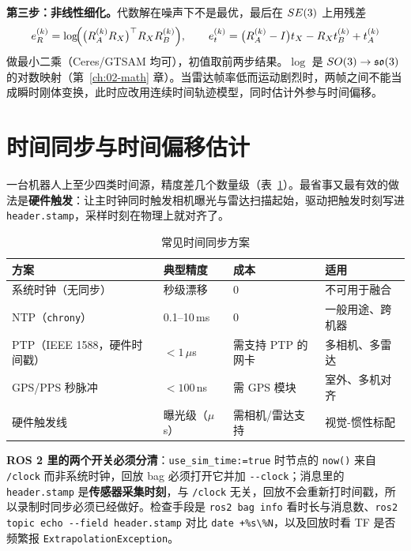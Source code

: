 \textbf{第三步：非线性细化。}代数解在噪声下不是最优，最后在 $SE(3)$ 上用残差
\begin{equation}
e_R^{(k)}=\log\!\Bigl(\bigl(R_A^{(k)}R_X\bigr)^{\top}R_XR_B^{(k)}\Bigr),\qquad
e_t^{(k)}=\bigl(R_A^{(k)}-I\bigr)t_X-R_Xt_B^{(k)}+t_A^{(k)}
\end{equation}
做最小二乘（Ceres/GTSAM 均可），初值取前两步结果。$\log$ 是 $SO(3)\to\mathfrak{so}(3)$ 的对数映射（第~\ref{ch:02-math} 章）。当雷达帧率低而运动剧烈时，两帧之间不能当成瞬时刚体变换，此时应改用连续时间轨迹模型，同时估计外参与时间偏移。

\section{时间同步与时间偏移估计}\label{sec:26-time}

一台机器人上至少四类时间源，精度差几个数量级（表~\ref{tab:26-clocksync}）。最省事又最有效的做法是\textbf{硬件触发}：让主时钟同时触发相机曝光与雷达扫描起始，驱动把触发时刻写进 \lstinline{header.stamp}，采样时刻在物理上就对齐了。

\begin{table}[htbp]
  \centering
  \caption{常见时间同步方案}\label{tab:26-clocksync}
  \small
  \begin{tabular}{llll}
    \toprule
    方案 & 典型精度 & 成本 & 适用 \\
    \midrule
    系统时钟（无同步） & 秒级漂移 & 0 & 不可用于融合 \\
    NTP（\lstinline{chrony}） & 0.1--10\,ms & 0 & 一般用途、跨机器 \\
    PTP（IEEE 1588，硬件时间戳） & $<1\,\mu$s & 需支持 PTP 的网卡 & 多相机、多雷达 \\
    GPS/PPS 秒脉冲 & $<100$\,ns & 需 GPS 模块 & 室外、多机对齐 \\
    硬件触发线 & 曝光级（$\mu$s） & 需相机/雷达支持 & 视觉-惯性标配 \\
    \bottomrule
  \end{tabular}
\end{table}

\textbf{ROS 2 里的两个开关必须分清}：\lstinline{use_sim_time:=true} 时节点的 \lstinline{now()} 来自 \lstinline{/clock} 而非系统时钟，回放 bag 必须打开它并加 \lstinline{--clock}；消息里的 \lstinline{header.stamp} 是\textbf{传感器采集时刻}，与 \lstinline{/clock} 无关，回放不会重新打时间戳，所以录制时同步必须已经做好。检查手段是 \lstinline{ros2 bag info} 看时长与消息数、\lstinline{ros2 topic echo --field header.stamp} 对比 \lstinline{date +%s\%N}，以及回放时看 TF 是否频繁报 \lstinline{ExtrapolationException}。

